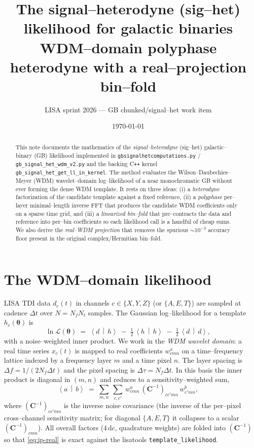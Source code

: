 \documentclass[11pt]{article}
\title{\bf The signal--heterodyne (sig--het) likelihood for galactic binaries\\
\large WDM--domain polyphase heterodyne with a real--projection bin--fold}
\author{LISA sprint 2026 --- GB chunked/signal--het work item}
\date{\today}
\newcommand{\dt}{\Delta t}
\newcommand{\Nf}{N_f}
\newcommand{\Nt}{N_t}
\newcommand{\ip}[2]{\left\langle #1 \,\middle|\, #2 \right\rangle}
\newcommand{\cc}{c'}
\newcommand{\invC}{(\bm{C}^{-1})}
\begin{document}
\maketitle

\begin{abstract}
This note documents the mathematics of the \emph{signal--heterodyne} (sig--het)
galactic--binary (GB) likelihood implemented in
\texttt{gbsignalhetcomputations.py} / \texttt{gb\_signal\_het\_wdm\_v2.py} and the
backing C\texttt{++} kernel
\texttt{gb\_signal\_het\_get\_ll\_in\_kernel}. The method evaluates the
Wilson--Daubechies--Meyer (WDM) wavelet--domain log--likelihood of a near
monochromatic GB without ever forming the dense WDM template. It rests on three
ideas: (i) a \emph{heterodyne} factorization of the candidate template against a
fixed reference, (ii) a \emph{polyphase} per--layer minimal--length inverse FFT
that produces the candidate WDM coefficients only on a sparse time grid, and
(iii) a \emph{linearized bin--fold} that pre--contracts the data and reference
into per--bin coefficients so each likelihood call is a handful of cheap sums.
We also derive the \emph{real--WDM projection} that removes the spurious
$\sim\!10^{-3}$ accuracy floor present in the original complex/Hermitian
bin--fold.
\end{abstract}

\tableofcontents

\section{The WDM--domain likelihood}

LISA TDI data $d_c(t)$ in channels $c\in\{X,Y,Z\}$ (or $\{A,E,T\}$) are sampled
at cadence $\dt$ over $N=\Nf\Nt$ samples. The Gaussian log--likelihood for a
template $h_c(\bm\theta)$ is
\begin{equation}
\ln\mathcal{L}(\bm\theta)
   \;=\; \ip{d}{h} \;-\; \tfrac12\,\ip{h}{h} \;-\; \tfrac12\,\ip{d}{d},
\label{eq:logL}
\end{equation}
with a noise--weighted inner product. We work in the \emph{WDM wavelet domain}:
a real time series $x_c(t)$ is mapped to real coefficients $w^{x}_{cmn}$ on a
time--frequency lattice indexed by a frequency layer $m$ and a time pixel $n$.
The layer spacing is $\Delta f = 1/(2\Nf\dt)$ and the pixel spacing is
$\Delta\tau = \Nf\dt$. In this basis the inner product is diagonal in $(m,n)$
and reduces to a sensitivity--weighted sum,
\begin{equation}
\ip{a}{b}
  \;=\; \sum_{m,n}\ \sum_{c,\cc}\,
        w^{a}_{cmn}\,\invC_{c\cc mn}\,w^{b}_{\cc mn},
\label{eq:ip-real}
\end{equation}
where $\invC_{c\cc mn}$ is the inverse noise covariance (the inverse of the
per--pixel cross--channel sensitivity matrix; for diagonal $\{A,E,T\}$ it
collapses to a scalar $\invC_{cmn}$). All overall factors ($4\,\mathrm{d}c$,
quadrature weights) are folded into $\invC$ so that \eqref{eq:ip-real} is exact
against the lisatools \texttt{template\_likelihood}.
\end{document}
